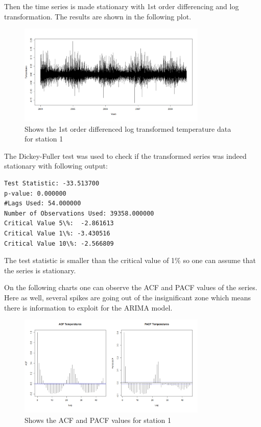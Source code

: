 \documentclass{article} %
\begin{document}
Then the time series is made stationary with 1st order differencing and log transformation. The results are shown in the following plot.

\begin{figure}[H]
  \centering
    \includegraphics[width=0.80\textwidth]{TempStatData}
  \caption{Shows the 1st order differenced log transformed temperature data for station 1 }
\end{figure}

The Dickey-Fuller test was used to check if the transformed series was indeed stationary with following output:
\begin{verbatim}
Test Statistic: -33.513700
p-value: 0.000000
#Lags Used: 54.000000
Number of Observations Used: 39358.000000
Critical Value 5\%:  -2.861613
Critical Value 1\%: -3.430516
Critical Value 10\%: -2.566809
\end{verbatim}

The test statistic is smaller than the critical value of 1\% so one can assume that the series is stationary.

On the following charts one can observe the ACF and PACF values of the series. Here as well, several spikes are going out of the insignificant zone which means there is information to exploit for the ARIMA model.

\begin{figure}[H]
  \centering
    \includegraphics[width=0.80\textwidth]{ACFandPACFTempRaw}
  \caption{Shows the ACF and PACF values for station 1 }
\end{figure}
\end{document}
